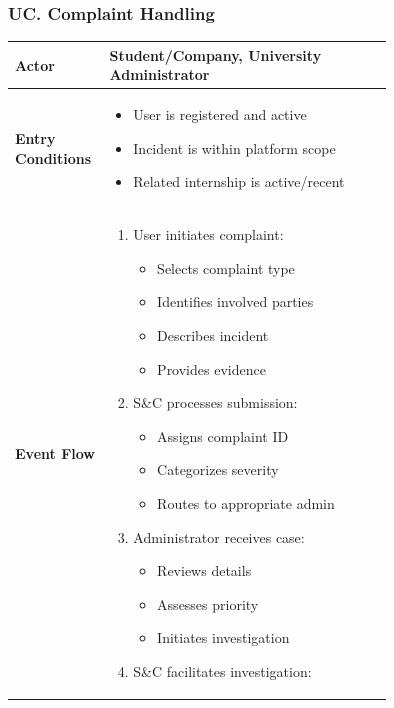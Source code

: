 \subsubsection*{UC\cuc . Complaint Handling}
\begin{center}
    \begin{longtable}{|l|p{0.75\linewidth}|}
        \hline
        \textbf{Actor}            & Student/Company, University Administrator \\
        \hline
        \textbf{Entry Conditions} & 
        \begin{itemize}
            \item User is registered and active
            \item Incident is within platform scope
            \item Related internship is active/recent
        \end{itemize} \\
        \hline
        \textbf{Event Flow}       & 
        \begin{enumerate}
            \item User initiates complaint:
            \begin{itemize}
                \item Selects complaint type
                \item Identifies involved parties
                \item Describes incident
                \item Provides evidence
            \end{itemize}
            \item S\&C processes submission:
            \begin{itemize}
                \item Assigns complaint ID
                \item Categorizes severity
                \item Routes to appropriate admin
            \end{itemize}
            \item Administrator receives case:
            \begin{itemize}
                \item Reviews details
                \item Assesses priority
                \item Initiates investigation
            \end{itemize}
            \item S\&C facilitates investigation:

\end{enumerate}
\end{longtable}
\end{center}
